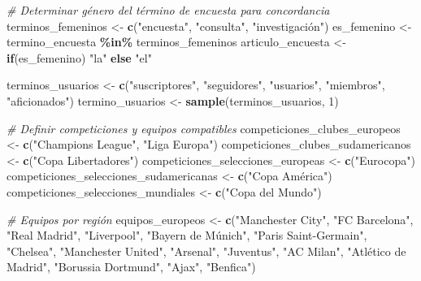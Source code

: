 \documentclass[
]{article}
\newenvironment{Shaded}{\begin{snugshade}}{\end{snugshade}}
\newcommand{\CommentTok}[1]{\textcolor[rgb]{0.56,0.35,0.01}{\textit{#1}}}
\newcommand{\ControlFlowTok}[1]{\textcolor[rgb]{0.13,0.29,0.53}{\textbf{#1}}}
\newcommand{\DecValTok}[1]{\textcolor[rgb]{0.00,0.00,0.81}{#1}}
\newcommand{\FunctionTok}[1]{\textcolor[rgb]{0.13,0.29,0.53}{\textbf{#1}}}
\newcommand{\NormalTok}[1]{#1}
\newcommand{\OtherTok}[1]{\textcolor[rgb]{0.56,0.35,0.01}{#1}}
\newcommand{\SpecialCharTok}[1]{\textcolor[rgb]{0.81,0.36,0.00}{\textbf{#1}}}
\newcommand{\StringTok}[1]{\textcolor[rgb]{0.31,0.60,0.02}{#1}}
\begin{document}
\begin{Shaded}
\begin{Highlighting}[]
\CommentTok{\# Determinar género del término de encuesta para concordancia}
\NormalTok{terminos\_femeninos }\OtherTok{\textless{}{-}} \FunctionTok{c}\NormalTok{(}\StringTok{"encuesta"}\NormalTok{, }\StringTok{"consulta"}\NormalTok{, }\StringTok{"investigación"}\NormalTok{)}
\NormalTok{es\_femenino }\OtherTok{\textless{}{-}}\NormalTok{ termino\_encuesta }\SpecialCharTok{\%in\%}\NormalTok{ terminos\_femeninos}
\NormalTok{articulo\_encuesta }\OtherTok{\textless{}{-}} \ControlFlowTok{if}\NormalTok{(es\_femenino) }\StringTok{"la"} \ControlFlowTok{else} \StringTok{"el"}

\NormalTok{terminos\_usuarios }\OtherTok{\textless{}{-}} \FunctionTok{c}\NormalTok{(}\StringTok{"suscriptores"}\NormalTok{, }\StringTok{"seguidores"}\NormalTok{, }\StringTok{"usuarios"}\NormalTok{, }\StringTok{"miembros"}\NormalTok{, }\StringTok{"aficionados"}\NormalTok{)}
\NormalTok{termino\_usuarios }\OtherTok{\textless{}{-}} \FunctionTok{sample}\NormalTok{(terminos\_usuarios, }\DecValTok{1}\NormalTok{)}

\CommentTok{\# Definir competiciones y equipos compatibles}
\NormalTok{competiciones\_clubes\_europeos }\OtherTok{\textless{}{-}} \FunctionTok{c}\NormalTok{(}\StringTok{"Champions League"}\NormalTok{, }\StringTok{"Liga Europa"}\NormalTok{)}
\NormalTok{competiciones\_clubes\_sudamericanos }\OtherTok{\textless{}{-}} \FunctionTok{c}\NormalTok{(}\StringTok{"Copa Libertadores"}\NormalTok{)}
\NormalTok{competiciones\_selecciones\_europeas }\OtherTok{\textless{}{-}} \FunctionTok{c}\NormalTok{(}\StringTok{"Eurocopa"}\NormalTok{)}
\NormalTok{competiciones\_selecciones\_sudamericanas }\OtherTok{\textless{}{-}} \FunctionTok{c}\NormalTok{(}\StringTok{"Copa América"}\NormalTok{)}
\NormalTok{competiciones\_selecciones\_mundiales }\OtherTok{\textless{}{-}} \FunctionTok{c}\NormalTok{(}\StringTok{"Copa del Mundo"}\NormalTok{)}

\CommentTok{\# Equipos por región}
\NormalTok{equipos\_europeos }\OtherTok{\textless{}{-}} \FunctionTok{c}\NormalTok{(}\StringTok{"Manchester City"}\NormalTok{, }\StringTok{"FC Barcelona"}\NormalTok{, }\StringTok{"Real Madrid"}\NormalTok{, }\StringTok{"Liverpool"}\NormalTok{,}
                     \StringTok{"Bayern de Múnich"}\NormalTok{, }\StringTok{"Paris Saint{-}Germain"}\NormalTok{, }\StringTok{"Chelsea"}\NormalTok{,}
                     \StringTok{"Manchester United"}\NormalTok{, }\StringTok{"Arsenal"}\NormalTok{, }\StringTok{"Juventus"}\NormalTok{, }\StringTok{"AC Milan"}\NormalTok{,}
                     \StringTok{"Atlético de Madrid"}\NormalTok{, }\StringTok{"Borussia Dortmund"}\NormalTok{, }\StringTok{"Ajax"}\NormalTok{, }\StringTok{"Benfica"}\NormalTok{)}


\end{Highlighting}
\end{Shaded}
\end{document}
